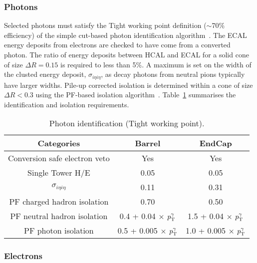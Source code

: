 \subsubsection{Photons\label{sec:recPhot}}
%
Selected photons must satisfy the Tight working point definition 
($\sim$70\% efficiency) of the simple cut-based photon identification
algorithm~\cite{ref:photon-id-egamma}. The ECAL energy deposits from electrons
are checked to have come from a converted photon. The ratio of energy deposits 
between HCAL and ECAL for a solid cone of size $\Delta R = 0.15$ is required to 
less than 5\%. A maximum is set on the width of the clusted energy deposit, 
$\sigma_{i\eta i\eta}$, as decay photons from neutral pions typically have larger
widths. Pile-up corrected isolation is determined within a cone of size $\Delta R < 0.3$ 
using the PF-based isolation algorithm~\cite{ref:photon-id-egamma}.
Table~\ref{tab:photon-id-egamma} summarises the identification and isolation requirements.
\begin{table}[ht!]
  \caption{Photon identification (Tight working point).\label{tab:photon-id-egamma}}
  \centering
  \footnotesize
  \begin{tabular}{ ccc }
    \hline
    \hline
    Categories                    & Barrel                             & EndCap                             \\
    \hline
    Conversion safe electron veto & Yes                                & Yes                                \\
    Single Tower H/E              & 0.05                               & 0.05                               \\
    $\sigma_{i\eta i\eta}$        & 0.11                               & 0.31                               \\
    PF charged hadron isolation   & 0.70                               & 0.50                               \\
    PF neutral hadron isolation   & 0.4 + 0.04 $\times$ $p_{\mathrm{T}}^{\gamma}$  & 1.5 + 0.04 $\times$ $p_{\mathrm{T}}^{\gamma}$  \\
    PF photon isolation           & 0.5 + 0.005 $\times$ $p_{\mathrm{T}}^{\gamma}$ & 1.0 + 0.005 $\times$ $p_{\mathrm{T}}^{\gamma}$ \\
    \hline
    \hline
  \end{tabular}
\end{table}
\FloatBarrier
\subsubsection{Electrons\label{sec:recElectron}}

